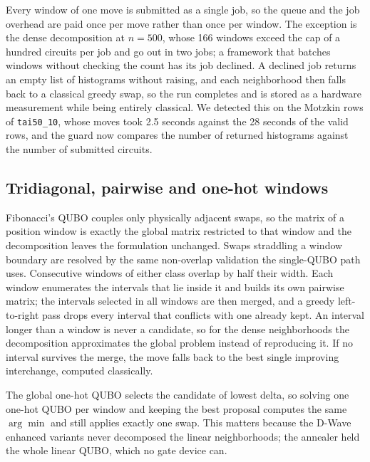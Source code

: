\documentclass[runningheads]{llncs}
\begin{document}
Every window of one move is submitted as a single job, so the queue and the job
overhead are paid once per move rather than once per window. The exception is
the dense decomposition at $n = 500$, whose 166 windows exceed the cap of a
hundred circuits per job and go out in two jobs; a framework that batches
windows without checking the count has its job declined. A declined job returns an empty list of histograms without raising, and each
neighborhood then falls back to a classical greedy swap, so the run completes
and is stored as a hardware measurement while being entirely classical. We
detected this on the Motzkin rows of \texttt{tai50\_10}, whose moves took 2.5
seconds against the 28 seconds of the valid rows, and the guard now compares the number of returned
histograms against the number of submitted circuits.

\subsection{Tridiagonal, pairwise and one-hot windows}
Fibonacci's QUBO couples only physically adjacent swaps, so the matrix of a
position window is exactly the global matrix restricted to that window and the
decomposition leaves the formulation unchanged. Swaps straddling a window
boundary are resolved by the same non-overlap validation the single-QUBO path
uses. Consecutive windows of either class overlap by half their width. Each window enumerates the
intervals that lie inside it and builds its own pairwise matrix; the intervals
selected in all windows are then merged, and a greedy left-to-right pass drops
every interval that conflicts with one already kept.
An interval longer than a window is never a candidate, so for the dense
neighborhoods the decomposition approximates the global problem instead of
reproducing it. If no interval survives
the merge, the move falls back to the best single improving interchange,
computed classically.

The global one-hot QUBO selects the candidate of lowest delta, so solving one
one-hot QUBO per window and keeping the best proposal computes the same
$\arg\min$ and still applies exactly one swap. This matters because the D-Wave enhanced variants never decomposed the linear
neighborhoods; the annealer held the whole linear QUBO, which no gate device
can.

\end{document}
